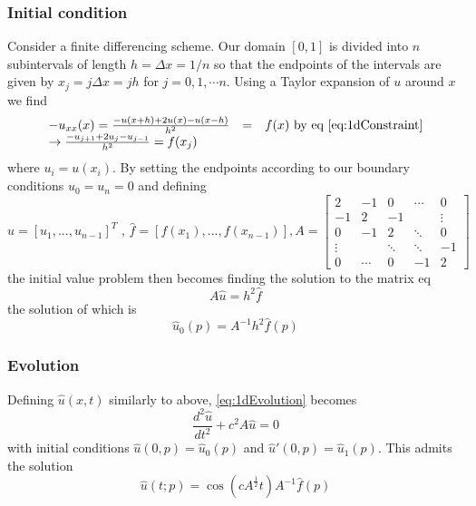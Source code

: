 \subsubsection{Initial condition}
Consider a finite differencing scheme. Our domain $[0,1]$ is divided into $n$ subintervals of length $h=\Delta x = 1 /n$ so that the endpoints of the intervals are given by $x_j = j  \Delta x = jh$ for $j= 0, 1, \cdots n$. Using a Taylor expansion of $u$ around $x$ we find
\begin{equation}
\begin{array}{lcl}
-u_{xx}(x)=\frac{-u(x+h)+2u(x)-u(x-h)}{h^2}&=& f(x)  \mbox{ by eq \ref{eq:1dConstraint}} \\
\rightarrow \frac{-u_{j+1} + 2u_j - u_{j-1} }{h^2} = f(x_j)
\end{array}
\end{equation}
where $u_i = u(x_i)$. By setting the endpoints according to our boundary conditions $u_0 = u_n=0$ and defining
\begin{equation}
\hat{u}=[u_1,...,u_{n-1}]^T \mbox{ , } \hat{f} = [f(x_1),...,f(x_{n-1})], A= \left[\begin{array}{ccccc}
2  & -1 & 0  & \cdots & 0\\
-1 & 2  & -1 &  & \vdots \\
0  & -1 & 2  & \ddots & 0 \\
\vdots & & \ddots & \ddots & -1 \\
0 & \cdots & 0 & -1 & 2 
\end{array}\right]
\end{equation}
the initial value problem then becomes finding the solution to the matrix eq
\begin{equation}
A \hat{u} = h^2 \hat{f}
\end{equation}
the solution of which is 
\begin{equation}
\hat{u}_0(p) = A^{-1}h^2\hat{f}(p)
\end{equation}

\subsubsection{Evolution}
Defining $\hat{u}(x,t)$ similarly to above, \ref{eq:1dEvolution} becomes
\begin{equation}
\frac{d^2 \hat{u}}{dt^2}+c^2 A \hat{u}=0
\end{equation}
with initial conditions $\hat{u}(0,p)=\hat{u}_0(p)$ and $\hat{u}'(0,p)=\hat{u}_1(p)$. This admits the solution
\begin{equation}\label{eq:dispSoln}
\hat{u}(t;p)=\cos(c A^{\frac{1}{2}}t)A^{-1}\hat{f}(p)
\end{equation}

